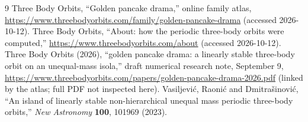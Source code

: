 \documentclass[10pt]{article}
\begin{document}
\begin{thebibliography}{9}
 Three Body Orbits, ``Golden pancake drama,'' online family atlas, \url{https://www.threebodyorbits.com/family/golden-pancake-drama} (accessed 2026-10-12).
 Three Body Orbits, ``About: how the periodic three-body orbits were computed,'' \url{https://www.threebodyorbits.com/about} (accessed 2026-10-12).
 Three Body Orbits (2026), ``golden pancake drama: a linearly stable three-body orbit on an unequal-mass isola,'' draft numerical research note, September 9, \url{https://www.threebodyorbits.com/papers/golden-pancake-drama-2026.pdf} (linked by the atlas; full PDF not inspected here).
 Vasiljevi\'c, Raoni\'c and Dmitra\v{s}inovi\'c, ``An island of linearly stable non-hierarchical unequal mass periodic three-body orbits,'' \emph{New Astronomy} \textbf{100}, 101969 (2023).
\end{thebibliography}
\end{document}
